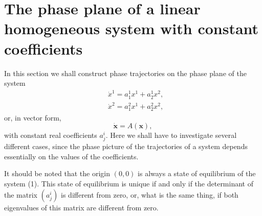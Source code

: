 \documentclass[10pt,a5paper]{book}
\theoremstyle{plain}
\theoremstyle{definition}
\theoremstyle{remark}
\begin{document}
\section{The phase plane of a linear homogeneous system with constant coefficients}
In this section we shall construct phase trajectories on the phase plane of the system
\begin{align*}
& \dot{x}^{1}=a_{1}^{1} x^{1}+a_{2}^{1} x^{2},  \tag{1}\\
& \dot{x}^{2}=a_{1}^{2} x^{1}+a_{2}^{2} x^{2},
\end{align*}
or, in vector form,
\begin{equation*}
\dot{\mathbf{x}}=A(\mathbf{x}), \tag{2}
\end{equation*}
with constant real coefficients $a_{j}^{i}$. Here we shall have to investigate several different cases, since the phase picture of the trajectories of a system depends essentially on the values of the coefficients.

It should be noted that the origin $(0,0)$ is always a state of equilibrium of the system (1). This state of equilibrium is unique if and only if the determinant of the matrix $\left(a_{j}^{i}\right)$ is different from zero, or, what is the same thing, if both eigenvalues of this matrix are different from zero.
\end{document}
